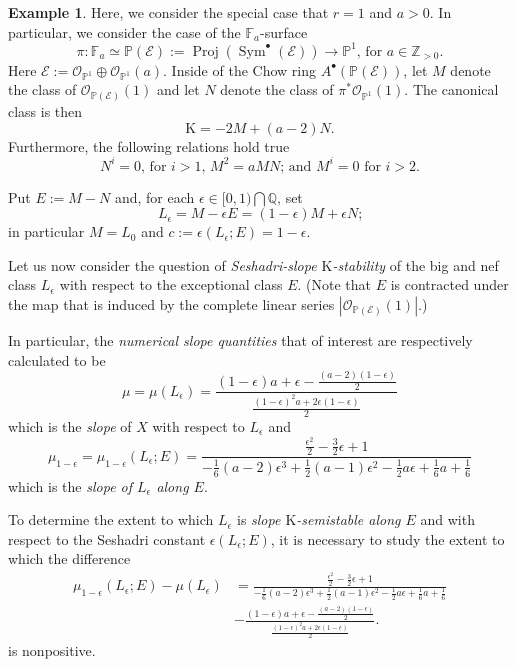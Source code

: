 \documentclass[10pt,letterpaper]{amsart}
\newcommand{\Osh}{{\mathcal O}}                        %
\newcommand{\K}{\mathrm{K}}
\newcommand{\PP}{\mathbb{P}} %
\newcommand{\QQ}{\mathbb{Q}} %
\newcommand{\ZZ}{\mathbb{Z}} %
\theoremstyle{definition}
\newtheorem{example}[theorem]{Example}
\numberwithin{equation}{section}
\begin{document}
\begin{example}\label{slope:stability:FFa:surfaces}
Here, we consider the special case that $r = 1$ and $a>0$.  In particular, we consider the case of the $\mathbb{F}_a$-surface 
$$
\pi \colon \mathbb{F}_a \simeq \PP(\mathcal{E}) := \operatorname{Proj} \left( \operatorname{Sym}^\bullet ( \mathcal{E} ) \right) \rightarrow \PP^1 \text{, for $a \in \ZZ_{>0}$.}
$$
Here $\mathcal{E} := \Osh_{\PP^1} \oplus \Osh_{\PP^1}(a) \text{.}$ Inside of the Chow ring $A^\bullet(\PP(\mathcal{E}))$, let $M$ denote the class of $\Osh_{\PP(\mathcal{E})}(1)$ and let $N$ denote the class of $\pi^* \Osh_{\PP^1}(1)$.  The canonical class is then
$$
\K = - 2 M + (a-2) N \text{.}
$$
Furthermore, the following relations hold true
$$
\text{$N^i = 0$, for $i > 1$, $M^2 = a M N$; and $M^i = 0$ for $i > 2$.}
$$

Put
$E := M - N$
and, for each 
$\epsilon \in [0,1) \bigcap \QQ \text{,}$
set
$$
L_\epsilon = M - \epsilon E 
 = (1-\epsilon) M + \epsilon N \text{;}
 $$
in particular
$M = L_ 0 $
and $c := \epsilon(L_\epsilon;E) = 1 - \epsilon \text{.}$ 

Let us now consider the question of \emph{Seshadri-slope $\K$-stability} of the big and nef class $L_\epsilon$ with respect to the exceptional class $E$.   (Note that $E$ is contracted under the map that is induced by the complete linear series $|\Osh_{\PP(\mathcal{E})}(1)|$.)

In particular, the \emph{numerical slope quantities} that of interest are respectively calculated to be
$$
\mu = \mu(L_{\epsilon}) 
= \frac{(1 - \epsilon)a + \epsilon - \frac{(a-2)(1-\epsilon)}{2} }{ \frac{(1-\epsilon)^2 a + 2 \epsilon (1 - \epsilon) }{2} } %
$$
which is the \emph{slope} of $X$ with respect to $L_{\epsilon}$ and
$$
\mu_{1 - \epsilon} = \mu_{1 - \epsilon}(L_{\epsilon};E) 
= \frac{\frac{\epsilon^2}{2} - \frac{3}{2}\epsilon + 1}{- \frac{1}{6}(a-2)\epsilon^3 + \frac{1}{2}(a-1)\epsilon^2 - \frac{1}{2}a\epsilon + \frac{1}{6}a+\frac{1}{6}} 
$$
which is the \emph{slope of $L_{\epsilon}$ along $E$}.  

To determine the extent to which $L_{\epsilon}$ is \emph{slope $\K$-semistable along $E$} and with respect to the Seshadri constant $\epsilon(L_\epsilon;E)$, it is necessary to study the extent to which the difference 
\begin{align*}
\mu_{1 -\epsilon} (L_{\epsilon};E)- \mu(L_{\epsilon}) & 
= \frac{\frac{\epsilon^2}{2} - \frac{3}{2}\epsilon + 1}{- \frac{1}{6}(a-2)\epsilon^3 + \frac{1}{2}(a-1)\epsilon^2 - \frac{1}{2}a\epsilon + \frac{1}{6}a+\frac{1}{6}} \\
& - 
\frac{(1 - \epsilon)a + \epsilon - \frac{(a-2)(1-\epsilon)}{2} }{ \frac{(1-\epsilon)^2 a + 2 \epsilon (1 - \epsilon) }{2} } \text{.} \end{align*}
is nonpositive.


\end{example}
\end{document}
